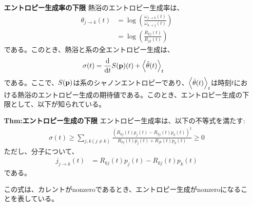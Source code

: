 \documentclass[a4paper,11pt]{jsarticle}
\numberwithin{equation}{section}
\begin{document}
\textbf{エントロピー生成率の下限}
熱浴のエントロピー生成率は、
\begin{align}
  \theta_{j \to k}(t) &= \log(\frac{\omega_{j \to k}(t)}{\omega_{k \to j}(t)})\\
  &= \log(\frac{R_{kj}(t)}{R_{jk}(t)})
\end{align}
である。このとき、熱浴と系の全エントロピー生成は、
\begin{align}
  \sigma(t) &= \dv{t}S(\vb{p})(t) + \ev{\hat{\theta}(t)}_t 
\end{align}
である。ここで、$S(\vb{p})$は系のシャノンエントロピーであり、$\ev{\hat{\theta}(t)}_t$は時刻$t$における熱浴のエントロピー生成の期待値である。このとき、エントロピー生成の下限として、以下が知られている。
\begin{itembox}[l]{\textbf{Thm:エントロピー生成の下限}}
    エントロピー生成率は、以下の不等式を満たす:
    \begin{align}
      \sigma(t) \geq \sum_{j,k(j \neq k)}\frac{(R_{kj}(t)p_j(t)-R_{kj}(t)p_k(t))^2}{R_{kj}(t)p_j(t)+R_{jk}(t)p_k(t)} \geq 0
    \end{align}
    ただし、分子について、
    \begin{align}
      j_{j\to k}(t) &= R_{kj}(t)p_j(t)-R_{kj}(t)p_k(t)
    \end{align}
    である。
\end{itembox}
この式は、カレントがnonzeroであるとき、エントロピー生成がnonzeroになることを表している。
\end{document}
